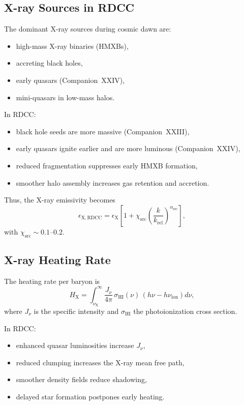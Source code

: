 \documentclass[11pt,a4paper]{article}
\begin{document}
\subsection{X-ray Sources in RDCC}

The dominant X-ray sources during cosmic dawn are:
\begin{itemize}
\item high-mass X-ray binaries (HMXBs),
\item accreting black holes,
\item early quasars (Companion~XXIV),
\item mini-quasars in low-mass halos.
\end{itemize}

In RDCC:
\begin{itemize}
\item black hole seeds are more massive (Companion~XXIII),
\item early quasars ignite earlier and are more luminous (Companion~XXIV),
\item reduced fragmentation suppresses early HMXB formation,
\item smoother halo assembly increases gas retention and accretion.
\end{itemize}

Thus, the X-ray emissivity becomes
\begin{equation}
\epsilon_{\mathrm{X,RDCC}}
=
\epsilon_{\mathrm{X}}
\left[
1
+
\chi_{\mathrm{src}}
\left(
\frac{k}{k_{\mathrm{rel}}}
\right)^{\alpha_{\mathrm{src}}}
\right],
\end{equation}
with $\chi_{\mathrm{src}} \sim 0.1$–$0.2$.

\subsection{X-ray Heating Rate}

The heating rate per baryon is
\begin{equation}
H_{\mathrm{X}}
=
\int_{\nu_{\mathrm{X}}}^{\infty}
\frac{J_{\nu}}{4\pi}\,
\sigma_{\mathrm{HI}}(\nu)\,
\left(h\nu - h\nu_{\mathrm{ion}}\right)
d\nu,
\end{equation}
where $J_{\nu}$ is the specific intensity and $\sigma_{\mathrm{HI}}$ the photoionization cross section.

In RDCC:
\begin{itemize}
\item enhanced quasar luminosities increase $J_{\nu}$,
\item reduced clumping increases the X-ray mean free path,
\item smoother density fields reduce shadowing,
\item delayed star formation postpones early heating.
\end{itemize}
\end{document}
